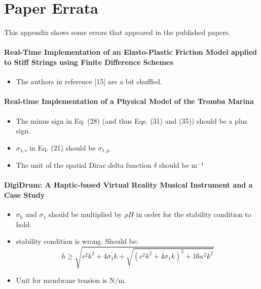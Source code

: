 \chapter{Paper Errata}\label{app:paperErrata}
This appendix shows some errors that appeared in the published papers.
\\
\subsubsection{Real-Time Implementation of an Elasto-Plastic Friction Model applied to Stiff Strings using Finite Difference Schemes \citeP[C]}
\begin{itemize}
    \item The authors in reference [15] are a bit shuffled.
\end{itemize}
\subsubsection{Real-time Implementation of a Physical Model of the Tromba Marina \citeP[D]}
\begin{itemize}
    \item The minus sign in Eq. (28) (and thus Eqs. (31) and (35)) should be a plus sign.
    \item $\sigma_{1,\text{s}}$ in Eq. (21) should be $\sigma_{1,\text{p}}$
    \item The unit of the spatial Dirac delta function $\delta$ should be m$^{-1}$
\end{itemize}
%
\subsubsection{DigiDrum: A Haptic-based Virtual Reality Musical Instrument and a Case Study \citeP[F]}
\begin{itemize}
    \item $\sigma_0$ and $\sigma_1$ should be multiplied by $\rho H$ in order for the stability condition to hold.
    \item stability condition is wrong. Should be: 
    \begin{equation}
        h \geq \sqrt{c^2k^2 + 4\sigma_1k + \sqrt{(c^2k^2+4\sigma_1k)^2 + 16\kappa^2k^2}}
    \end{equation}
    \item Unit for membrane tension is N/m.
\end{itemize}
